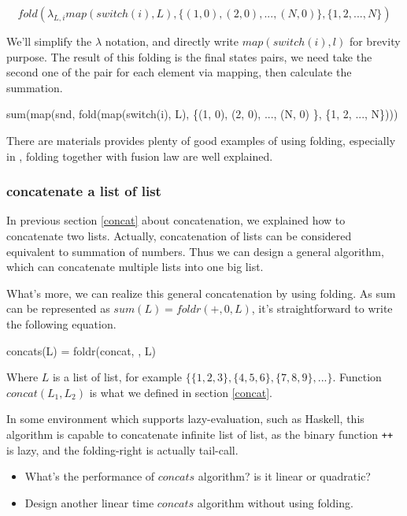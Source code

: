 \documentclass{article}
\begin{document}
\[
fold(\lambda_{L, i} map(switch(i), L), \{(1, 0), (2, 0), ..., (N, 0) \}, \{1, 2, ..., N\})
\]

We'll simplify the $\lambda$ notation, and directly write $map(switch(i), l)$ for brevity purpose.
The result of this folding is the final states pairs, we need take the second one of the pair
for each element via mapping, then calculate the summation.

\be
sum(map(snd, fold(map(switch(i), L), \{(1, 0), (2, 0), ..., (N, 0) \}, \{1, 2, ..., N\})))
\ee

There are materials provides plenty of good examples of using folding, especially in \cite{fp-pearls},
folding together with fusion law are well explained.

\subsubsection{concatenate a list of list}

In previous section \ref{concat} about concatenation, we explained how to concatenate two lists.
Actually, concatenation of lists can be considered equivalent to summation of numbers. Thus we
can design a general algorithm, which can concatenate multiple lists into one big list.

What's more, we can realize this general concatenation by using folding. As sum can be represented
as $sum(L) = foldr(+, 0, L)$, it's straightforward to write the following equation.

\be
concats(L) = foldr(concat, \Phi, L)
\ee

Where $L$ is a list of list, for example $\{\{1, 2, 3\}, \{4, 5, 6\}, \{7, 8, 9\}, ...\}$. Function 
$concat(L_1, L_2)$ is what we defined in section \ref{concat}.

In some environment which supports lazy-evaluation, such as Haskell, this algorithm is capable to 
concatenate infinite list of list, as the binary function \verb|++| is lazy, and the folding-right
is actually tail-call.

\begin{Exercise}
\begin{itemize}
\item What's the performance of $concats$ algorithm? is it linear or quadratic?
\item Design another linear time $concats$ algorithm without using folding.
\end{itemize}
\end{Exercise}
\end{document}

